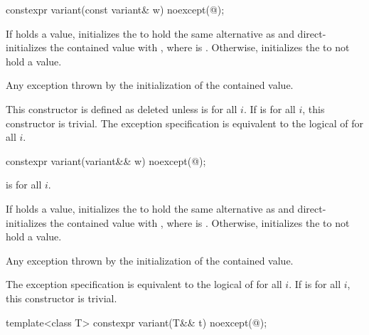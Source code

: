 %
\begin{itemdecl}
constexpr variant(const variant& w) noexcept(@\seebelow@);
\end{itemdecl}

\begin{itemdescr}
\pnum
\effects
If  holds a value, initializes the  to hold the same
alternative as  and direct-initializes the contained value
with , where  is .
Otherwise, initializes the  to not hold a value.

\pnum
\throws
Any exception thrown by
the initialization of the contained value.

\pnum
\remarks
This constructor is defined as deleted unless
 is  for all $i$.
If 
is  for all $i$, this constructor is trivial.
The exception specification is equivalent to the logical  of
 for all $i$.
\end{itemdescr}

%
\begin{itemdecl}
constexpr variant(variant&& w) noexcept(@\seebelow@);
\end{itemdecl}

\begin{itemdescr}
\pnum
\constraints
{} is  for all $i$.

\pnum
\effects
If  holds a value, initializes the  to hold the same
alternative as  and direct-initializes the contained value with
, where  is .
Otherwise, initializes the  to not hold a value.

\pnum
\throws
Any exception thrown by
the initialization of the contained value.

\pnum
\remarks
The exception specification is equivalent to the logical  of
 for all $i$.
If 
is  for all $i$, this constructor is trivial.
\end{itemdescr}

%
\begin{itemdecl}
template<class T> constexpr variant(T&& t) noexcept(@\seebelow@);
\end{itemdecl}

